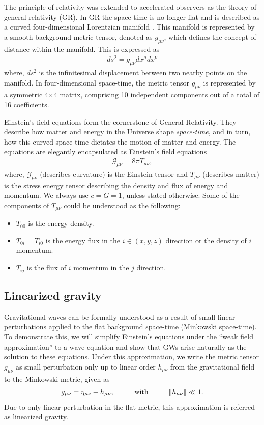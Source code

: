 The principle of relativity was extended to accelerated observers as the theory of general relativity (GR). In GR the space-time is no longer flat and is described as a curved four-dimensional Lorentzian manifold \cite{Schutz2009-ie}. This manifold is represented by a smooth background metric tensor, denoted as $g_{\mu\nu}$, which defines the concept of distance within the manifold. This is expressed as
\begin{align}
    ds^2 = g_{\mu\nu}dx^{\mu}dx^{\nu}
\end{align}
where, $ds^2$ is the infinitesimal displacement between two nearby points on the manifold. In four-dimensional space-time, the metric tensor $g_{\mu\nu}$ is represented by a symmetric 4$\times$4 matrix, comprising 10 independent components out of a total of 16 coefficients.

Einstein's field equations form the cornerstone of General Relativity. They describe how matter and energy in the Universe shape \textit{space-time}, and in turn, how this curved space-time dictates the motion of matter and energy. The equations are elegantly encapsulated as Einstein's field equations
\begin{align}
    \mathcal{G}_{\mu\nu} = 8\pi T_{\mu \nu},
    \label{Eq:Einstein_eq}
\end{align}
where, $\mathcal{G}_{\mu\nu}$ (describes curvature) is the Einstein tensor and $T_{\mu\nu}$ (describes matter) is the stress energy tensor describing the density and flux of energy and momentum. We always use $c = G = 1$, unless stated otherwise. Some of the components of $T_{\mu\nu}$ could be understood as the following:
\begin{itemize}
    \item $T_{00}$ is the energy density.
    \item $T_{0i} = T_{i0}$ is the energy flux in the $i \in (x,y,z)$ direction or the density of $i$ momentum.
    \item $T_{ij}$ is the flux of $i$ momentum in the $j$ direction.
\end{itemize}

\subsection{Linearized gravity}
Gravitational waves can be formally understood as a result of small linear perturbations applied to the flat background space-time (Minkowski space-time). To demonstrate this, we will simplify Einstein's equations under the ``weak field approximation'' to a wave equation and show that GWs arise naturally as the solution to these equations. Under this approximation, we write the metric tensor $g_{\mu\nu}$ as small perturbation only up to linear order $h_{\mu\nu}$ from the gravitational field to the Minkowski metric, given as
\begin{align}
    g_{\mu\nu} = \eta_{\mu\nu} + h_{\mu\nu},    \hspace{1cm} \text{with} \hspace{1cm}    \norm{h_{\mu\nu}} \ll 1.
\end{align}
Due to only linear perturbation in the flat metric, this approximation is referred as linearized gravity. 

